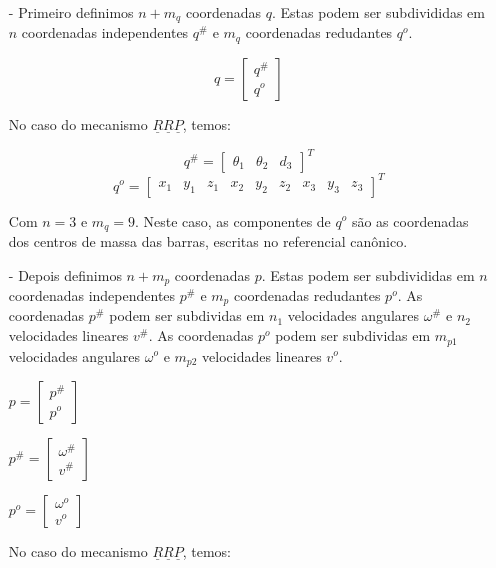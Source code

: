 \documentclass[12pt,a4paper]{article}
\begin{document}
\begin{itemize}
\begin{itemize}
\item[-] Primeiro definimos $n + m_q$ coordenadas  $q$. Estas podem ser subdivididas em $n$ coordenadas independentes $q^{\#}$ e $m_q$ coordenadas redudantes $q^o$.

$$ q = \begin{bmatrix}
q^{\#} \\
q^o
\end{bmatrix} $$

No caso do mecanismo $\underline{R}\underline{R}\underline{P}$, temos:




$$ q^{\#} = \begin{bmatrix}
\theta_1 & \theta_2 & d_3
\end{bmatrix}^T $$
$$ q^o = \begin{bmatrix}
x_1 & y_1 & z_1 & x_2 & y_2 & z_2 & x_3 & y_3 & z_3 
\end{bmatrix}^T $$

Com $n = 3$ e $m_q = 9$. Neste caso, as componentes de $q^o$ são as coordenadas dos centros de massa das barras, escritas no referencial canônico. \\

\item[-] Depois definimos $n + m_p$ coordenadas  $p$. Estas podem ser subdivididas em $n$ coordenadas independentes $p^{\#}$ e $m_p$ coordenadas redudantes $p^o$. As coordenadas $p^{\#}$ podem ser subdividas em $n_1$ velocidades angulares $\omega^{\#}$ e $n_2$ velocidades lineares $v^{\#}$. As coordenadas $p^o$ podem ser subdividas em $m_{p1}$ velocidades angulares $\omega^o$ e $m_{p2}$ velocidades lineares $v^o$.

\begin{multicols}{3}
$ p = \begin{bmatrix}
p^{\#} \\
p^o
\end{bmatrix} $

$ p^{\#} = \begin{bmatrix}
\omega^{\#} \\
v^{\#}
\end{bmatrix} $



$ p^o = \begin{bmatrix}
\omega^o \\
v^o
\end{bmatrix} $

\end{multicols}

No caso do mecanismo $\underline{R}\underline{R}\underline{P}$, temos:



\end{itemize}
\end{itemize}
\end{document}
